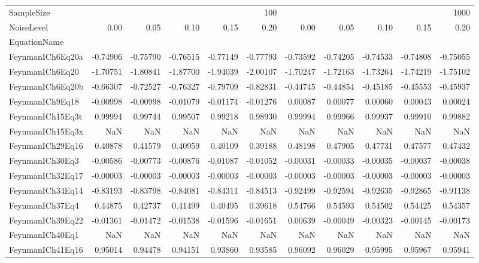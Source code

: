 \begin{tabular}{lrrrrrrrrrr}
\toprule
SampleSize & \multicolumn{5}{r}{100} & \multicolumn{5}{r}{1000} \\
NoiseLevel & 0.00 & 0.05 & 0.10 & 0.15 & 0.20 & 0.00 & 0.05 & 0.10 & 0.15 & 0.20 \\
EquationName &  &  &  &  &  &  &  &  &  &  \\
\midrule
FeynmanICh6Eq20a & -0.74906 & -0.75790 & -0.76515 & -0.77149 & -0.77793 & -0.73592 & -0.74205 & -0.74533 & -0.74808 & -0.75055 \\
FeynmanICh6Eq20 & -1.70751 & -1.80841 & -1.87700 & -1.94039 & -2.00107 & -1.70247 & -1.72163 & -1.73264 & -1.74219 & -1.75102 \\
FeynmanICh6Eq20b & -0.66307 & -0.72527 & -0.76327 & -0.79709 & -0.82831 & -0.44745 & -0.44854 & -0.45185 & -0.45553 & -0.45937 \\
FeynmanICh9Eq18 & -0.00998 & -0.00998 & -0.01079 & -0.01174 & -0.01276 & 0.00087 & 0.00077 & 0.00060 & 0.00043 & 0.00024 \\
FeynmanICh15Eq3t & 0.99994 & 0.99744 & 0.99507 & 0.99218 & 0.98930 & 0.99994 & 0.99966 & 0.99937 & 0.99910 & 0.99882 \\
FeynmanICh15Eq3x & NaN & NaN & NaN & NaN & NaN & NaN & NaN & NaN & NaN & NaN \\
FeynmanICh29Eq16 & 0.40878 & 0.41579 & 0.40959 & 0.40109 & 0.39188 & 0.48198 & 0.47905 & 0.47731 & 0.47577 & 0.47432 \\
FeynmanICh30Eq3 & -0.00586 & -0.00773 & -0.00876 & -0.01087 & -0.01052 & -0.00031 & -0.00033 & -0.00035 & -0.00037 & -0.00038 \\
FeynmanICh32Eq17 & -0.00003 & -0.00003 & -0.00003 & -0.00003 & -0.00003 & -0.00003 & -0.00003 & -0.00003 & -0.00003 & -0.00003 \\
FeynmanICh34Eq14 & -0.83193 & -0.83798 & -0.84081 & -0.84311 & -0.84513 & -0.92499 & -0.92594 & -0.92635 & -0.92865 & -0.91138 \\
FeynmanICh37Eq4 & 0.44875 & 0.42737 & 0.41499 & 0.40495 & 0.39618 & 0.54766 & 0.54593 & 0.54502 & 0.54425 & 0.54357 \\
FeynmanICh39Eq22 & -0.01361 & -0.01472 & -0.01538 & -0.01596 & -0.01651 & 0.00639 & -0.00049 & -0.00323 & -0.00145 & -0.00173 \\
FeynmanICh40Eq1 & NaN & NaN & NaN & NaN & NaN & NaN & NaN & NaN & NaN & NaN \\
FeynmanICh41Eq16 & 0.95014 & 0.94478 & 0.94151 & 0.93860 & 0.93585 & 0.96092 & 0.96029 & 0.95995 & 0.95967 & 0.95941 \\

\end{tabular}

